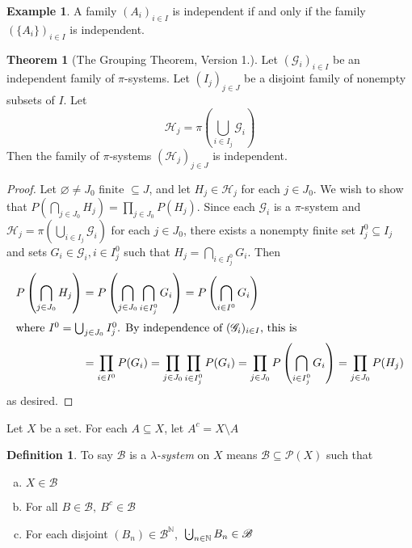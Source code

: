 \documentclass{article}
\newcommand{\N}{\mathbb{N}}
\newcommand{\bigcupdot}{\mathop{\mathchoice{\hspace{0.45em}}{\hspace{0.35em}}{}{}\cdot\mathchoice{\hspace{-0.85em}}{\hspace{-0.725em}}{}{}\bigcup\limits}}
\newcommand{\p}[1]{\left(#1\right)} %
\theoremstyle{definition}
\newtheorem{theorem}{Theorem}
\newtheorem*{example}{Example}
\newtheorem*{definition}{Definition}
\begin{document}
\begin{example}
A family $(A_i)_{i \in I}$ is independent if and only if the family $(\{A_i\})_{i \in I}$ is independent. %
\end{example}

\begin{theorem}[The Grouping Theorem, Version 1.]
    Let $(\mathscr{G}_i)_{i \in I}$ be an independent family of $\pi$-systems. Let $(I_j)_{j \in J}$ be a disjoint family of nonempty subsets of $I$. Let
    $$\mathscr{H}_j = \pi \left(\bigcup_{i \in I_j} \mathscr{G}_i \right)$$
    Then the family of $\pi$-systems $(\mathscr{H}_j)_{j \in J}$ is independent.
\end{theorem}

\begin{proof}
    Let $\varnothing \neq J_0$ finite $\subseteq J$, and let $H_j \in \mathscr{H}_j$ for each $j \in J_0$.
    We wish to show that $P\p{\bigcap_{j \in J_0} H_j} = \prod_{j \in J_0} P(H_j)$.
    Since each $\mathscr{G}_i$ is a $\pi$-system and $\mathscr{H}_j = \pi\p{\bigcup_{i \in I_j} \mathscr{G}_i}$ for each $j \in J_0$, there exists a nonempty finite set $I_j^0 \subseteq I_j$ and sets $G_i \in \mathscr{G}_i, i \in I_j^0$ such that
    $H_j = \bigcap_{i \in I_j^0} G_i$.
    Then 
    \begin{align*}
        P\left( \bigcap_{j \in J_0} H_j \right) &= P\left( \bigcap_{j \in J_0} \bigcap_{i \in I_j^0} G_i \right) = P\left( \bigcap_{i \in I^0} G_i \right) \\
        \intertext{where $I^0 = \bigcup_{j \in J_0} I_j^0$. By independence of $(\mathscr{G}_i)_{i \in I}$, this is}
        &= \prod_{i \in I^0} P(G_i) = \prod_{j \in J_0} \prod_{i \in I^0_j} P(G_i) = \prod_{j \in J_0} P \left( \bigcap_{i \in I^0_j} G_i \right) = \prod_{j \in J_0} P(H_j)
    \end{align*}
    as desired.
\end{proof}

Let $X$ be a set. For each $A \subseteq X$, let $A^c = X \setminus A$

\begin{definition}
To say $\mathscr{B}$ is a \emph{$\lambda$-system} on $X$ means $\mathscr{B} \subseteq \mathcal{P}(X)$ such that
\begin{enumerate}[(a)]
    \item $X \in \mathscr{B}$
    \item For all $B \in \mathscr{B},\ B^c \in \mathscr{B}$
    \item For each disjoint $(B_n) \in \mathscr{B}^{\N}$,\ $\bigcupdot_{n \in \N} B_n \in \mathscr{B}$
\end{enumerate}
\end{definition}
\end{document}
